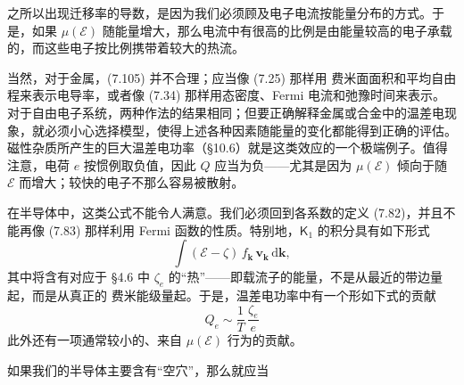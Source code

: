 之所以出现迁移率的导数，是因为我们必须顾及电子电流按能量分布的方式。于是，如果 $\mu(\mathcal{E})$ 随能量增大，那么电流中有很高的比例是由能量较高的电子承载的，而这些电子按比例携带着较大的热流。

当然，对于金属，(7.105) 并不合理；应当像 (7.25) 那样用 费米面面积和平均自由程来表示电导率，或者像 (7.34) 那样用态密度、Fermi 电流和弛豫时间来表示。对于自由电子系统，两种作法的结果相同；但要正确解释金属或合金中的温差电现象，就必须小心选择模型，使得上述各种因素随能量的变化都能得到正确的评估。磁性杂质所产生的巨大温差电功率（§10.6）就是这类效应的一个极端例子。值得注意，电荷 $e$ 按惯例取负值，因此 $Q$ 应当为负——尤其是因为 $\mu(\mathcal{E})$ 倾向于随 $\mathcal{E}$ 而增大；较快的电子不那么容易被散射。

在半导体中，这类公式不能令人满意。我们必须回到各系数的定义 (7.82)，并且不能再像 (7.83) 那样利用 Fermi 函数的性质。特别地，$\mathsf{K}_{1}$ 的积分具有如下形式
\begin{equation*}
\int(\mathcal{E}-\zeta)\,f_{\mathbf{k}}\,\mathbf{v}_{\mathbf{k}}\,\mathrm{d}\mathbf{k},\tag{7.108}
\end{equation*}
其中将含有对应于 §4.6 中 $\zeta_{e}$ 的“热”——即载流子的能量，不是从最近的带边量起，而是从真正的 费米能级量起。于是，温差电功率中有一个形如下式的贡献
\begin{equation*}
Q_{e}\sim\frac{1}{T}\,\frac{\zeta_{e}}{e}\tag{7.109}
\end{equation*}
此外还有一项通常较小的、来自 $\mu(\mathcal{E})$ 行为的贡献。

如果我们的半导体主要含有“空穴”，那么就应当
